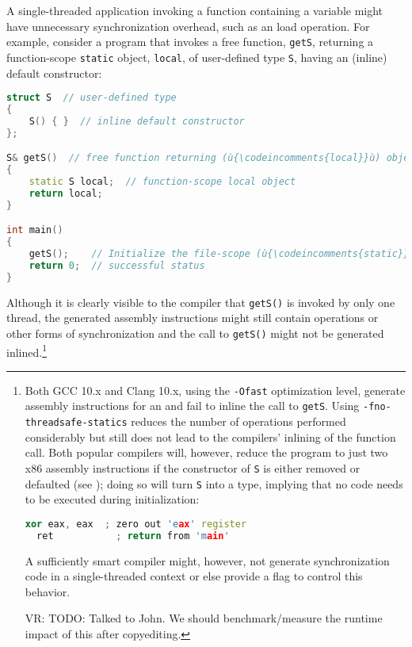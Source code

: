 A single-threaded application invoking a function containing a
  variable might
have unnecessary synchronization overhead, such as an 
load operation. For example, consider a program that invokes a free
function, \lstinline!getS!, returning a function-scope \lstinline!static!
object, \lstinline!local!, of user-defined type \lstinline!S!, having an
 (inline) default constructor:

\begin{lstlisting}[language=C++]
struct S  // user-defined type
{
    S() { }  // inline default constructor
};

S& getS()  // free function returning (ù{\codeincomments{local}}ù) object
{
    static S local;  // function-scope local object
    return local;
}

int main()
{
    getS();    // Initialize the file-scope (ù{\codeincomments{static}}ù) singleton.
    return 0;  // successful status
}
\end{lstlisting}
    
\noindent Although it is clearly visible to the compiler that \lstinline!getS()! is
invoked by only one thread, the generated assembly instructions might
still contain  operations or other forms of
synchronization and the call to \lstinline!getS()! might not be generated
inlined.{\cprotect\footnote{Both GCC 10.x and Clang 10.x, using the
\lstinline!-Ofast! optimization level, generate assembly instructions for
an  and fail to inline the call
to \lstinline!getS!. Using \lstinline!-fno-threadsafe-statics! reduces the
number of operations performed considerably but still does not lead to
the compilers' inlining of the function call. Both popular compilers
will, however, reduce the program to just two x86 assembly
instructions if the  constructor of \lstinline!S!
  is either removed or defaulted (see );
  doing so will turn \lstinline!S! into a 
  type, implying that no code needs to be executed during
  initialization:

  \begin{lstlisting}[language=C++, basicstyle={\ttfamily\footnotesize}]
  xor eax, eax  ; zero out 'eax' register
  ret           ; return from 'main'
  \end{lstlisting}
      
\noindent A sufficiently smart compiler might, however, not generate
  synchronization code in a single-threaded context or else provide a
  flag to control this behavior.

  VR: TODO: Talked to John. We should benchmark/measure the runtime
  impact of this after copyediting.}}

